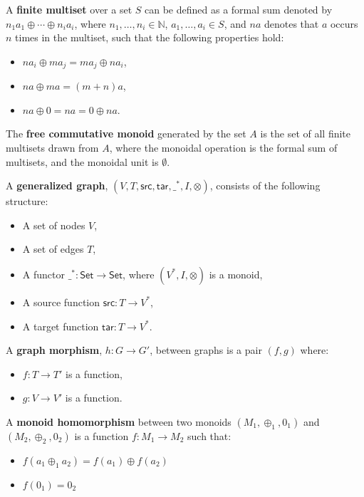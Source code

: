 \begin{definition}
  \label{def:Finite-Multiset}
  A \textbf{finite multiset} over a set $S$ can be defined as a formal
  sum denoted by $n_1a_1 \oplus \cdots \oplus n_ia_i$, where $n_1,
  \ldots, n_i \in \mathbb{N}$, $a_1, \ldots, a_i \in S$, and $na$
  denotes that $a$ occurs $n$ times in the multiset, such that the
  following properties hold:
  \begin{itemize}    
  \item $na_i \oplus ma_j = ma_j \oplus na_i$,
  \item $na \oplus ma = (m+n)a$,
  \item $na \oplus 0 = na = 0 \oplus na$.
  \end{itemize}
\end{definition}
%
\begin{definition}
  \label{def:Free-Commutative-Monoid}  
  The \textbf{free commutative monoid} generated by the set $A$ is the
  set of all finite multisets drawn from $A$, where the monoidal
  operation is the formal sum of multisets, and the monoidal unit is
  $\emptyset$.
\end{definition}
%
\begin{definition}
  \label{def:Graph}
  A \textbf{generalized graph}, $(V, T, \mathsf{src}, \mathsf{tar}, \_^*,I,\otimes)$, consists of the following structure:
  \begin{itemize}
  \item A set of nodes $V$,
  \item A set of edges $T$,
  \item A functor $\_^* : \mathsf{Set} \to \mathsf{Set}$, where
    $(V^*,I,\otimes)$ is a monoid,
  \item A source function $\mathsf{src} : T \to V^*$,
  \item A target function $\mathsf{tar} : T \to V^*$.
  \end{itemize}
\end{definition}
%
\begin{definition}
  \label{def:Graph-Morphism}
  A \textbf{graph morphism}, $h : G \to G'$, between graphs is a pair $(f, g)$ where:
  \begin{itemize}
  \item $f: T \to T'$ is a function,
  \item $g: V \to V'$ is a function.
  \end{itemize}
\end{definition}

\begin{definition}
  \label{Monoid-Homomorphism}
  A \textbf{monoid homomorphism} between two monoids $(M_1, \oplus_1, 0_1)$ and $(M_2, \oplus_2, 0_2)$
  is a function $f: M_1 \to M_2$ such that:
  \begin{itemize}
  \item $f(a_1 \oplus_1 a_2) = f(a_1) \oplus f(a_2)$
  \item $f (0_1) = 0_2$
  \end{itemize}
\end{definition}

